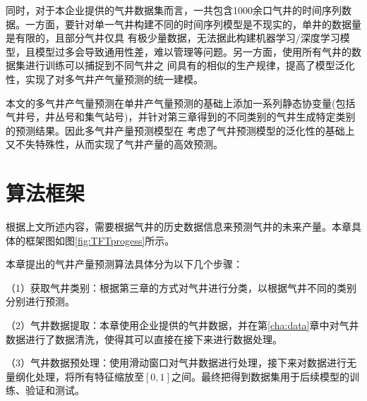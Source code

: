 同时，对于本企业提供的气井数据集而言，一共包含1000余口气井的时间序列数据。一方面，要针对单一气井构建不同的时间序列模型是不现实的，单井的数据量是有限的，且部分气井仅具
有极少量数据，无法据此构建机器学习/深度学习模型，且模型过多会导致通用性差，难以管理等问题。另一方面，使用所有气井的数据集进行训练可以捕捉到不同气井之
间具有的相似的生产规律，提高了模型泛化性，实现了对多气井产气量预测的统一建模。

本文的多气井产气量预测在单井产气量预测的基础上添加一系列静态协变量(包括气井号，井丛号和集气站号)，并针对第三章得到的不同类别的气井生成特定类别的预测结果。因此多气井产量预测模型在
考虑了气井预测模型的泛化性的基础上又不失特殊性，从而实现了气井产量的高效预测。
\section{算法框架}
根据上文所述内容，需要根据气井的历史数据信息来预测气井的未来产量。本章具体的框架图如图\ref{fig:TFTprogess}所示。

本章提出的气井产量预测算法具体分为以下几个步骤：

（1）获取气井类别：根据第三章的方式对气井进行分类，以根据气井不同的类别分别进行预测。

（2）气井数据提取：本章使用企业提供的气井数据，并在第\ref{cha:data}章中对气井数据进行了数据清洗，使得其可以直接在接下来进行数据处理。

（3）气井数据预处理：使用滑动窗口对气井数据进行处理，接下来对数据进行无量纲化处理，将所有特征缩放至$[0,1]$之间。最终把得到数据集用于后续模型的训练、验证和测试。

